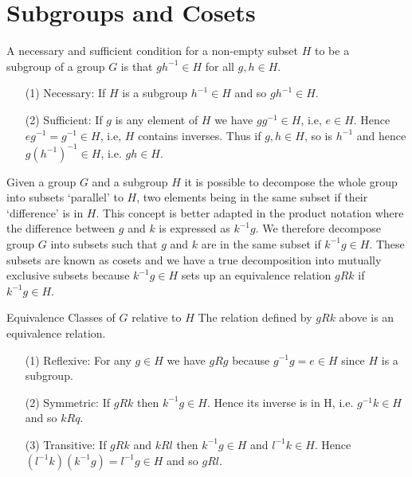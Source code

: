 \section{Subgroups and Cosets}
\begin{theorem}
A necessary and sufficient condition for a non-empty subset $H$ to be a\\ subgroup of a group $G$ is that $gh^{-1} \in H$ for all $g, h \in H$.
\end{theorem}

\begin{itemize}
\item[(1)] Necessary: If $H$ is a subgroup $h^{-1}\in H$ and so $gh^{-1} \in H$.
\item[(2)] Sufficient: If $g$ is any element of $H$ we have $gg^{-1} \in H$, i.e, $e\in H$. Hence $eg^{-1} = g^{-1}\in H$, i.e, $H$ contains inverses. Thus if $g,h \in H$, so is $h^{-1}$ and hence
$g(h^{-1})^{-1} \in H$, i.e. $gh \in H$.
\end{itemize}

Given a group $G$ and a subgroup $H$ it is possible to decompose the whole group into subsets `parallel' to $H$, two elements being in the same subset if their `difference' is in $H$. This concept is 
better adapted in the product notation where the difference between $g$ and $k$ is expressed as $k^{-1}g$. We therefore decompose group $G$ into subsets such that $g$ and $k$ are 
in the same subset if $k^{-1}g\in H$. These subsets are known as cosets and we have a true decomposition into mutually exclusive subsets because $k^{-1}g\in H$ sets up an equivalence
relation $gRk$ if $k^{-1}g\in H$.

\begin{theorem}{Equivalence Classes of $G$ relative to $H$}
The relation defined by $gRk$ above is an equivalence relation.
\end{theorem}

\begin{itemize}
\item[(1)] Reflexive: For any $g\in H$ we have $gRg$ because $g^{-1}g = e \in H$ since $H$ is a subgroup.
\item[(2)] Symmetric: If $gRk$ then $k^{-1}g \in H$. Hence its inverse is in H, i.e. $g^{-1}k\in H$ and so $kRq$.
\item[(3)] Transitive: If $gRk$ and $kRl$ then $k^{-1}g \in H$ and $l^{-1}k \in H$. Hence $(l^{-1}k)(k^{-1}g) = l^{-1}g \in H$ and so $gRl$.
\end{itemize}

